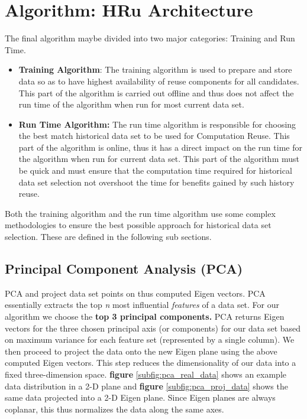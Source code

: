 \section{Algorithm: HRu Architecture}
The final algorithm maybe divided into two major categories: Training and Run Time. 
\begin{itemize}
	\item \textbf{Training Algorithm}: The training algorithm is used to prepare and store data so as to have highest availability of reuse components for all candidates. This part of the algorithm is carried out offline and thus does not affect the run time of the algorithm when run for most current data set.
	\item \textbf{Run Time Algorithm:} The run time algorithm is responsible for choosing the best match historical data set to be used for Computation Reuse. This part of the algorithm is online, thus it has a direct impact on the run time for the algorithm when run for current data set. This part of the algorithm must be quick and must ensure that the computation time required for historical data set selection not overshoot the time for benefits gained by such history reuse.
\end{itemize}

Both the training algorithm and the run time algorithm use some complex methodologies to ensure the best possible approach for historical data set selection. These are defined in the following sub sections.

\subsection{Principal Component Analysis (PCA)}
\label{principal_comp_analysis}
	PCA\cite{pca}\cite{opencv_library} \cite{opencv_manual} and project data set points on thus computed Eigen vectors. PCA essentially extracts the top \textit{n} most influential \textit{features} of a data set. For our algorithm we choose the \textbf{top 3 principal components.} PCA returns Eigen vectors for the three chosen principal axis (or components) for our data set based on maximum variance for each feature set (represented by a single column). We then proceed to project the data onto the new Eigen plane using the above computed Eigen vectors. This step reduces the dimensionality of our data into a fixed three-dimension space.
\textbf{figure}  \ref{subfig:pca_real_data} shows an example data distribution in a 2-D plane and \textbf{figure} \ref{subfig:pca_proj_data} shows the same data projected into a 2-D Eigen plane. Since Eigen planes are always coplanar, this thus normalizes the data along the same axes. 

